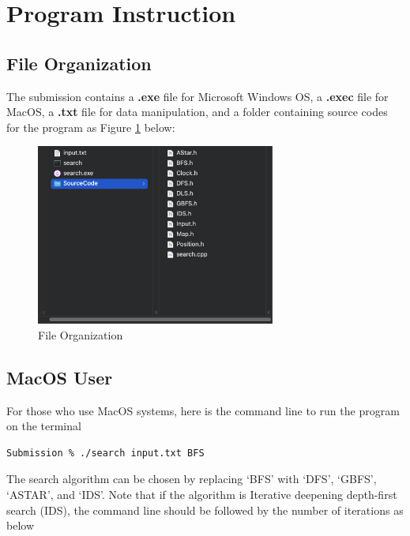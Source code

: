 \documentclass{assignment}
\begin{document}
\tableofcontents


\newpage
\section{Program Instruction}
\subsection{File Organization}

The submission contains a \textbf{.exe} file for Microsoft Windows OS, a \textbf{.exec} file for MacOS, a \textbf{.txt} file for data manipulation, and a folder containing source codes for the program as Figure \ref{fig:fig1} below:

\begin{figure}[h]
    \centering
    \includegraphics[width=0.7\textwidth]{./assets/FileOrganization.png}
    \caption{File Organization}
    \label{fig:fig1}
\end{figure}


\subsection{MacOS User}
For those who use MacOS systems, here is the command line to run the program on the terminal

\begin{verbatim}
Submission % ./search input.txt BFS 
\end{verbatim}

The search algorithm can be chosen by replacing ‘BFS’ with ‘DFS’, ‘GBFS’, ‘ASTAR’, and ‘IDS’. Note that if the algorithm is Iterative deepening depth-first search (IDS), the command line should be followed by the number of iterations as below 
\end{document}
